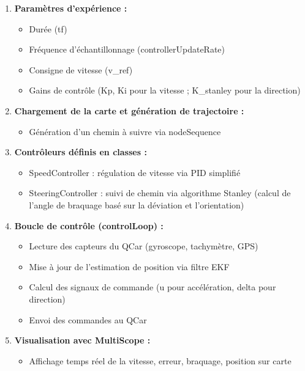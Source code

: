 \documentclass[12pt, a4paper]{report}
\begin{document}
\begin{enumerate}
    \item \textbf{Paramètres d'expérience :}
    \begin{itemize}
        \item Durée (tf)
        \item Fréquence d'échantillonnage (controllerUpdateRate)
        \item Consigne de vitesse (v\_ref)
        \item Gains de contrôle (Kp, Ki pour la vitesse ; K\_stanley pour la direction)
    \end{itemize}

    \item \textbf{Chargement de la carte et génération de trajectoire :}
    \begin{itemize}
        \item Génération d'un chemin à suivre via nodeSequence
    \end{itemize}

    \item \textbf{Contrôleurs définis en classes :}
    \begin{itemize}
        \item SpeedController : régulation de vitesse via PID simplifié
        \item SteeringController : suivi de chemin via algorithme Stanley (calcul de l'angle de braquage basé sur la déviation et l'orientation)
    \end{itemize}
\newpage
    \item \textbf{Boucle de contrôle (controlLoop) :}
    \begin{itemize}
        \item Lecture des capteurs du QCar (gyroscope, tachymètre, GPS)
        \item Mise à jour de l'estimation de position via filtre EKF
        \item Calcul des signaux de commande (u pour accélération, delta pour direction)
        \item Envoi des commandes au QCar
    \end{itemize}

    \item \textbf{Visualisation avec MultiScope :}
    \begin{itemize}
        \item Affichage temps réel de la vitesse, erreur, braquage, position sur carte
    \end{itemize}
\end{enumerate}
\end{document}
